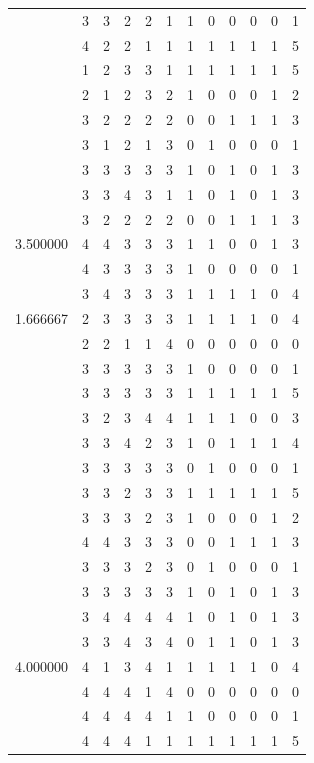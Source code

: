 \documentclass[]{book}
\theoremstyle{definition}
\theoremstyle{definition}
\theoremstyle{definition}
\theoremstyle{remark}
\begin{document}
\begin{table}
{\begin{tabular}[t]{rrrrrrrrrrrr}
 & 3 & 3 & 2 & 2 & 1 & 1 & 0 & 0 & 0 & 0 & 1\\
 & 4 & 2 & 2 & 1 & 1 & 1 & 1 & 1 & 1 & 1 & 5\\
 & 1 & 2 & 3 & 3 & 1 & 1 & 1 & 1 & 1 & 1 & 5\\
 & 2 & 1 & 2 & 3 & 2 & 1 & 0 & 0 & 0 & 1 & 2\\
 & 3 & 2 & 2 & 2 & 2 & 0 & 0 & 1 & 1 & 1 & 3\\
 & 3 & 1 & 2 & 1 & 3 & 0 & 1 & 0 & 0 & 0 & 1\\
 & 3 & 3 & 3 & 3 & 3 & 1 & 0 & 1 & 0 & 1 & 3\\
 & 3 & 3 & 4 & 3 & 1 & 1 & 0 & 1 & 0 & 1 & 3\\
 & 3 & 2 & 2 & 2 & 2 & 0 & 0 & 1 & 1 & 1 & 3\\
3.500000 & 4 & 4 & 3 & 3 & 3 & 1 & 1 & 0 & 0 & 1 & 3\\
 & 4 & 3 & 3 & 3 & 3 & 1 & 0 & 0 & 0 & 0 & 1\\
 & 3 & 4 & 3 & 3 & 3 & 1 & 1 & 1 & 1 & 0 & 4\\
1.666667 & 2 & 3 & 3 & 3 & 3 & 1 & 1 & 1 & 1 & 0 & 4\\
 & 2 & 2 & 1 & 1 & 4 & 0 & 0 & 0 & 0 & 0 & 0\\
 & 3 & 3 & 3 & 3 & 3 & 1 & 0 & 0 & 0 & 0 & 1\\
 & 3 & 3 & 3 & 3 & 3 & 1 & 1 & 1 & 1 & 1 & 5\\
 & 3 & 2 & 3 & 4 & 4 & 1 & 1 & 1 & 0 & 0 & 3\\
 & 3 & 3 & 4 & 2 & 3 & 1 & 0 & 1 & 1 & 1 & 4\\
 & 3 & 3 & 3 & 3 & 3 & 0 & 1 & 0 & 0 & 0 & 1\\
 & 3 & 3 & 2 & 3 & 3 & 1 & 1 & 1 & 1 & 1 & 5\\
 & 3 & 3 & 3 & 2 & 3 & 1 & 0 & 0 & 0 & 1 & 2\\
 & 4 & 4 & 3 & 3 & 3 & 0 & 0 & 1 & 1 & 1 & 3\\
 & 3 & 3 & 3 & 2 & 3 & 0 & 1 & 0 & 0 & 0 & 1\\
 & 3 & 3 & 3 & 3 & 3 & 1 & 0 & 1 & 0 & 1 & 3\\
 & 3 & 4 & 4 & 4 & 4 & 1 & 0 & 1 & 0 & 1 & 3\\
 & 3 & 3 & 4 & 3 & 4 & 0 & 1 & 1 & 0 & 1 & 3\\
4.000000 & 4 & 1 & 3 & 4 & 1 & 1 & 1 & 1 & 1 & 0 & 4\\
 & 4 & 4 & 4 & 1 & 4 & 0 & 0 & 0 & 0 & 0 & 0\\
 & 4 & 4 & 4 & 4 & 1 & 1 & 0 & 0 & 0 & 0 & 1\\
 & 4 & 4 & 4 & 1 & 1 & 1 & 1 & 1 & 1 & 1 & 5\\

\end{tabular}}
\end{table}
\end{document}
